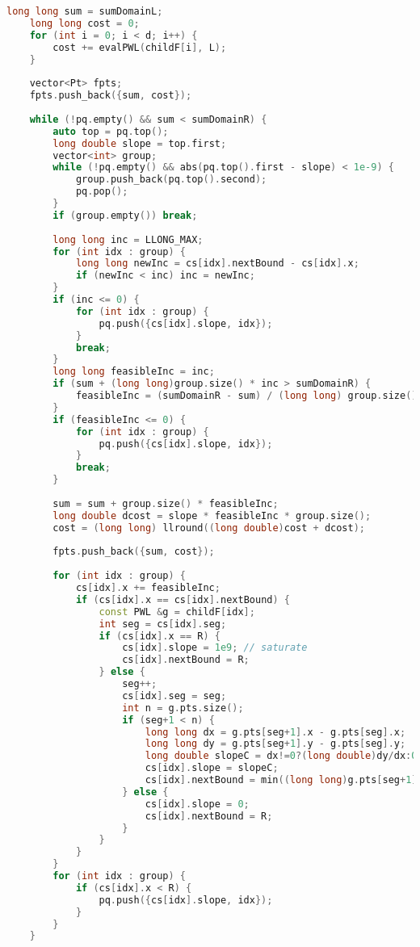 \begin{lstlisting}[language=C++]
    long long sum = sumDomainL;
    long long cost = 0;
    for (int i = 0; i < d; i++) {
        cost += evalPWL(childF[i], L);
    }
 
    vector<Pt> fpts;
    fpts.push_back({sum, cost});
 
    while (!pq.empty() && sum < sumDomainR) {
        auto top = pq.top();
        long double slope = top.first;
        vector<int> group;
        while (!pq.empty() && abs(pq.top().first - slope) < 1e-9) {
            group.push_back(pq.top().second);
            pq.pop();
        }
        if (group.empty()) break;
 
        long long inc = LLONG_MAX;
        for (int idx : group) {
            long long newInc = cs[idx].nextBound - cs[idx].x;
            if (newInc < inc) inc = newInc;
        }
        if (inc <= 0) {
            for (int idx : group) {
                pq.push({cs[idx].slope, idx});
            }
            break;
        }
        long long feasibleInc = inc;
        if (sum + (long long)group.size() * inc > sumDomainR) {
            feasibleInc = (sumDomainR - sum) / (long long) group.size();
        }
        if (feasibleInc <= 0) {
            for (int idx : group) {
                pq.push({cs[idx].slope, idx});
            }
            break;
        }
 
        sum = sum + group.size() * feasibleInc;
        long double dcost = slope * feasibleInc * group.size();
        cost = (long long) llround((long double)cost + dcost);
 
        fpts.push_back({sum, cost});
 
        for (int idx : group) {
            cs[idx].x += feasibleInc;
            if (cs[idx].x == cs[idx].nextBound) {
                const PWL &g = childF[idx];
                int seg = cs[idx].seg;
                if (cs[idx].x == R) {
                    cs[idx].slope = 1e9; // saturate
                    cs[idx].nextBound = R;
                } else {
                    seg++;
                    cs[idx].seg = seg;
                    int n = g.pts.size();
                    if (seg+1 < n) {
                        long long dx = g.pts[seg+1].x - g.pts[seg].x;
                        long long dy = g.pts[seg+1].y - g.pts[seg].y;
                        long double slopeC = dx!=0?(long double)dy/dx:0;
                        cs[idx].slope = slopeC;
                        cs[idx].nextBound = min((long long)g.pts[seg+1].x, R);
                    } else {
                        cs[idx].slope = 0;
                        cs[idx].nextBound = R;
                    }
                }
            }
        }
        for (int idx : group) {
            if (cs[idx].x < R) {
                pq.push({cs[idx].slope, idx});
            }
        }
    }
 

\end{lstlisting}
